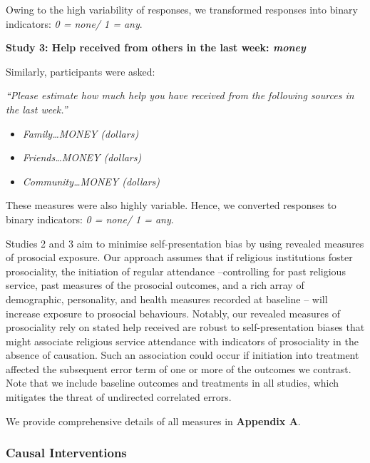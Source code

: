 \documentclass[
  single column]{article}
\providecommand{\tightlist}{%
  \setlength{\itemsep}{0pt}\setlength{\parskip}{0pt}}\usepackage{longtable,booktabs,array}
\begin{document}
Owing to the high variability of responses, we transformed responses
into binary indicators: \emph{0 = none/ 1 = any}.

\textbf{Study 3: Help received from others in the last week:
\emph{money} }

Similarly, participants were asked:

\emph{``Please estimate how much help you have received from the
following sources in the last week.''}

\begin{itemize}
\tightlist
\item
  \emph{Family\ldots MONEY (dollars)}
\item
  \emph{Friends\ldots MONEY (dollars)}
\item
  \emph{Community\ldots MONEY (dollars)}
\end{itemize}

These measures were also highly variable. Hence, we converted responses
to binary indicators: \emph{0 = none/ 1 = any}.

Studies 2 and 3 aim to minimise self-presentation bias by using revealed
measures of prosocial exposure. Our approach assumes that if religious
institutions foster prosociality, the initiation of regular attendance
--controlling for past religious service, past measures of the prosocial
outcomes, and a rich array of demographic, personality, and health
measures recorded at baseline -- will increase exposure to prosocial
behaviours. Notably, our revealed measures of prosociality rely on
stated help received are robust to self-presentation biases that might
associate religious service attendance with indicators of prosociality
in the absence of causation. Such an association could occur if
initiation into treatment affected the subsequent error term of one or
more of the outcomes we contrast. Note that we include baseline outcomes
and treatments in all studies, which mitigates the threat of undirected
correlated errors.

We provide comprehensive details of all measures in \textbf{Appendix A}.

\subsubsection{Causal Interventions}\label{causal-interventions}
\end{document}

